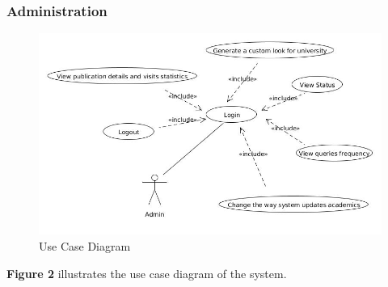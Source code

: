 \subsubsection{Administration}

\begin{figure}
\centering
\includegraphics[scale=0.4]{./figures/use_case.jpg}
\caption{Use Case Diagram}
\end{figure}

\textbf{Figure 2} illustrates the use case diagram of the system.



